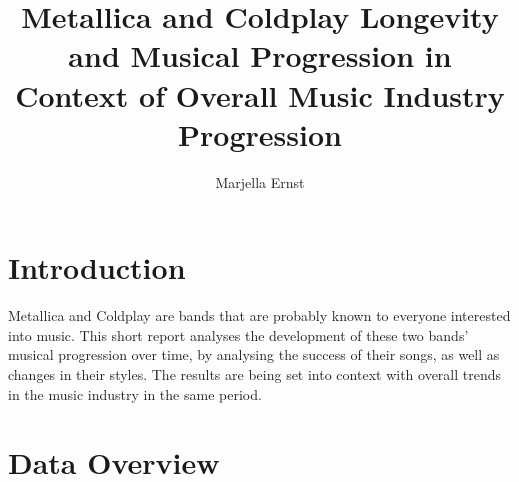 \documentclass[11pt,preprint]{elsarticle}
\numberwithin{equation}{section}
\numberwithin{figure}{section}
\numberwithin{table}{section}
\begin{document}
\begin{frontmatter}  %

\title{Metallica and Coldplay Longevity and Musical Progression in
Context of Overall Music Industry Progression}





\author[Add1]{Marjella Ernst}





\address[Add1]{Stellenbosch University, Stellenbosch, South Africa}



\vspace{1cm}





\vspace{0.5cm}

\end{frontmatter}

\setcounter{footnote}{0}



\pagestyle{fancy}
\chead{}
\rhead{}
\lfoot{}
\lhead{}
\cfoot{}


\headsep 35pt %




\section{\texorpdfstring{Introduction
\label{Introduction}}{Introduction }}\label{introduction}

Metallica and Coldplay are bands that are probably known to everyone
interested into music. This short report analyses the development of
these two bands' musical progression over time, by analysing the success
of their songs, as well as changes in their styles. The results are
being set into context with overall trends in the music industry in the
same period.

\section{Data Overview}\label{data-overview}
\end{document}
